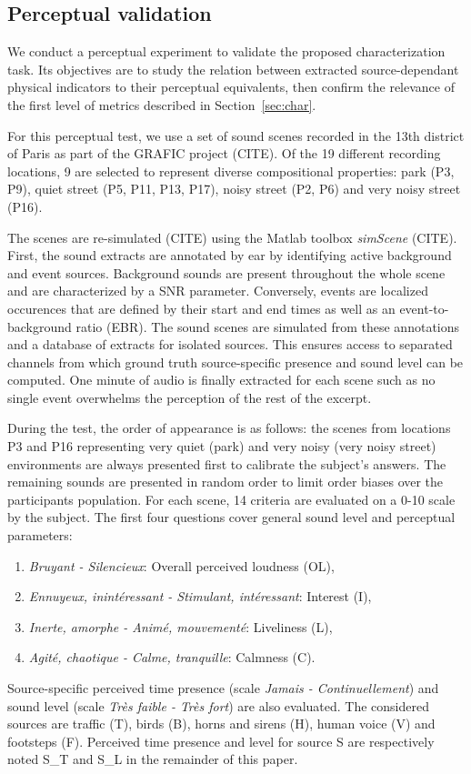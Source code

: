 \documentclass{article}
\begin{document}
\begin{sloppy}
\section{Perceptual validation}
\label{sec:val}

We conduct a perceptual experiment to validate the proposed characterization task. Its objectives are to study the relation between extracted source-dependant physical indicators to their perceptual equivalents, then confirm the relevance of the first level of metrics described in Section~\ref{sec:char}.

For this perceptual test, we use a set of sound scenes recorded in the 13th district of Paris as part of the GRAFIC project (CITE). Of the 19 different recording locations, 9 are selected to represent diverse compositional properties: park (P3, P9), quiet street (P5, P11, P13, P17), noisy street (P2, P6) and very noisy street (P16).

The scenes are re-simulated (CITE) using the Matlab toolbox \textit{simScene} (CITE). First, the sound extracts are annotated by ear by identifying active background and event sources. Background sounds are present throughout the whole scene and are characterized by a SNR parameter. Conversely, events are localized occurences that are defined by their start and end times as well as an event-to-background ratio (EBR). The sound scenes are simulated from these annotations and a database of extracts for isolated sources. This ensures access to separated channels from which ground truth source-specific presence and sound level can be computed. One minute of audio is finally extracted for each scene such as no single event overwhelms the perception of the rest of the excerpt. 

During the test, the order of appearance is as follows: the scenes from locations P3 and P16 representing very quiet (park) and very noisy (very noisy street) environments are always presented first to calibrate the subject's answers. The remaining sounds are presented in random order to limit order biases over the participants population. For each scene, 14 criteria are evaluated on a 0-10 scale by the subject. The first four questions cover general sound level and perceptual parameters:
\begin{enumerate}
\item \textit{Bruyant - Silencieux}: Overall perceived loudness (OL),
\item \textit{Ennuyeux, inint\'eressant - Stimulant, int\'eressant}: Interest (I),
\item \textit{Inerte, amorphe - Anim\'e, mouvement\'e}: Liveliness (L),
\item \textit{Agit\'e, chaotique - Calme, tranquille}: Calmness (C).
\end{enumerate}
Source-specific perceived time presence (scale \textit{Jamais - Continuellement}) and sound level (scale \textit{Tr\`es faible - Tr\`es fort}) are also evaluated. The considered sources are traffic (T), birds (B), horns and sirens (H), human voice (V) and footsteps (F). Perceived time presence and level for source S are respectively noted S\_T and S\_L in the remainder of this paper.


\end{sloppy}
\end{document}
